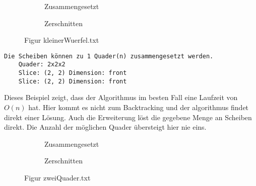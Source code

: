 \documentclass[a4paper,10pt,ngerman]{scrartcl}
\newcommand{\simplecube}[8]%
{
    \begin{scope}[shift={#1}]
        \fill[gray!40,canvas is yz plane at x=#2, opacity=#8] (0,0) rectangle (#3,#4);
        \fill[gray!10,canvas is xz plane at y=#3, opacity=#8] (0,0) rectangle (#2,#4);
        \fill[white  ,canvas is xy plane at z=#4, opacity=#8] (0,0) rectangle (#2,#3);
        \foreach\i/\j in {0/1, 1/1, 1/0}
            {
            \draw[line#5] (0,#3*\i,#4*\j) --++ (#2,0,0);
            \draw[line#6] (#2*\i,0,#4*\j) --++ (0,#3,0);
            \draw[line#7] (#2*\i,#3*\j,0) --++ (0,0,#4);
        }
    \end{scope}
}
\newcommand{\smallSquare}[4]%
{
    \begin{scope}[shift={#1}]
        \simplecube{(0,     0,      0)}     {1}{2}{2}   {a}{a}{a}   {1}
        \simplecube{(1+#4,   0,      0))}    {1}{2}{2}   {a}{a}{a}   {1}
    \end{scope}
}
\newcommand{\unsolvedSquare}[4]%
{
    \begin{scope}[shift={#1}]
        \simplecube{(0,     0,      0)}     {1}{2}{2}   {a}{a}{a}   {1}
        \simplecube{(1+#4,   0,      0))}    {1}{2}{2}   {a}{a}{a}   {1}
        \simplecube{(2+2*#4,   0,      0))}    {1}{1}{1}   {a}{a}{a}   {1}
    \end{scope}
}
\begin{document}
    \begin{figure}[H]
        \centering
        \def\a{3.2}
        \def\b{1.2}
        \begin{subfigure}[b]{0.45\textwidth}
            \centering %
            \caption{Zusammengesetzt}\label{fig:figA2}
        \end{subfigure}
        \begin{subfigure}[b]{0.45\textwidth}
            \centering %
            \caption{Zerschnitten}\label{fig:figB2}
        \end{subfigure}
        \caption{Figur kleinerWuerfel.txt}\label{fig:figAB2}
    \end{figure}

    \begin{lstlisting}[frame=single, title=Programmausgabe kleinerWuerfel.txt, breaklines=true,label={lst:lstlisting3}]
    Die Scheiben können zu 1 Quader(n) zusammengesetzt werden.
    Quader: 2x2x2
    Slice: (2, 2) Dimension: front
    Slice: (2, 2) Dimension: front
    \end{lstlisting}

    Dieses Beispiel zeigt, dass der Algorithmus im besten Fall eine Laufzeit von $O(n)$ hat.
    Hier kommt es nicht zum Backtracking und der algorithmus findet direkt einer Lösung.
    Auch die Erweiterung löst die gegebene Menge an Scheiben direkt.
    Die Anzahl der möglichen Quader übersteigt hier nie eins.

    \begin{figure}[H]
        \centering
        \def\a{3.2}
        \def\b{1.2}
        \begin{subfigure}[b]{0.45\textwidth}
            \centering %
            \caption{Zusammengesetzt}\label{fig:figA3}
        \end{subfigure}
        \begin{subfigure}[b]{0.45\textwidth}
            \centering %
            \caption{Zerschnitten}\label{fig:figB3}
        \end{subfigure}
        \caption{Figur zweiQuader.txt}\label{fig:figAB3}
    \end{figure}
\end{document}
